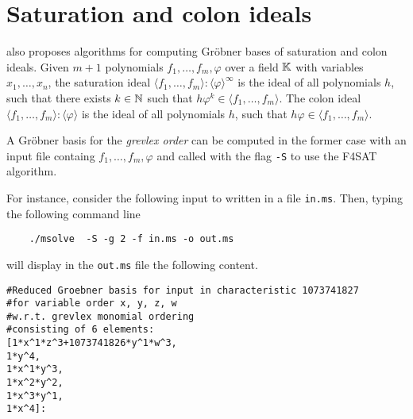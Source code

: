 \documentclass[a4paper,english,11pt]{scrartcl}
\theoremstyle{definition}
\theoremstyle{remark}
\begin{document}
\section{Saturation and colon ideals}\label{sec:f4sat}
\msolve also proposes algorithms for computing Gr\"obner bases of
saturation and colon ideals. Given $m+1$ polynomials
$f_1,\ldots,f_m,\varphi$ over a field $\mathbb{K}$ with variables
$x_1,\ldots,x_n$,
the saturation ideal
$\langle f_1,\ldots,f_m\rangle:\langle \varphi\rangle^{\infty}$ is the ideal of all
polynomials $h$, such that there exists $k\in\mathbb{N}$ such that
$h \varphi^k\in\langle f_1,\ldots,f_m\rangle$.
The colon ideal
$\langle f_1,\ldots,f_m\rangle:\langle \varphi\rangle$ is the ideal of all
polynomials $h$, such that
$h \varphi\in\langle f_1,\ldots,f_m\rangle$.

A Gr\"obner basis for the \emph{grevlex order} can be computed in the
former case with an input file containg $f_1,\ldots,f_m,\varphi$ and
called with the flag \verb+-S+ to use the F4SAT algorithm.

For instance, consider the following input to \msolve written in a file
\verb+in.ms+.
Then, typing the following command line
\begin{tcolorbox}
  \begin{verbatim}
    ./msolve  -S -g 2 -f in.ms -o out.ms 
  \end{verbatim}
\end{tcolorbox}
will display in the \verb+out.ms+ file the following content. 
\begin{tcolorbox}
  \begin{lstlisting}
#Reduced Groebner basis for input in characteristic 1073741827
#for variable order x, y, z, w
#w.r.t. grevlex monomial ordering
#consisting of 6 elements:
[1*x^1*z^3+1073741826*y^1*w^3,
1*y^4,
1*x^1*y^3,
1*x^2*y^2,
1*x^3*y^1,
1*x^4]:
  \end{lstlisting}
\end{tcolorbox}



\end{document}
